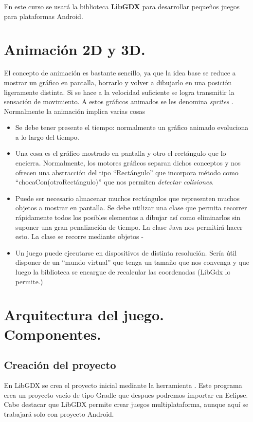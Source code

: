 \documentclass[a4paper,12pt,spanish]{sphinxmanual}
\begin{document}
En este curso se usará la biblioteca \textbf{LibGDX} para desarrollar pequeños juegos para plataformas Android.


\section{Animación 2D y 3D.}
\label{tema4:animacion-2d-y-3d}
El concepto de animación es bastante sencillo, ya que la idea base se reduce a mostrar un gráfico en pantalla, borrarlo y volver a dibujarlo en una posición ligeramente distinta. Si se hace a la velocidad suficiente se logra transmitir la sensación de movimiento. A estos gráficos animados se les denomina \emph{sprites} . Normalmente la animación implica varias cosas
\begin{itemize}
\item {} 
Se debe tener presente el tiempo: normalmente un gráfico animado evoluciona a lo largo del tiempo.

\item {} 
Una cosa es el gráfico mostrado en pantalla y otro el rectángulo que lo encierra. Normalmente, los motores gráficos separan dichos conceptos y nos ofrecen una abstracción del tipo ``Rectángulo'' que incorpora método como ``chocaCon(otroRectángulo)'' que nos permiten \emph{detectar colisiones}.

\item {} 
Puede ser necesario almacenar muchos rectángulos que representen muchos objetos a mostrar en pantalla. Se debe utilizar una clase que permita recorrer rápidamente todos los posibles elementos a dibujar así como eliminarlos sin suponer una gran penalización de tiempo. La clase Java  nos permitirá hacer esto. La clase  se recorre mediante objetos -

\item {} 
Un juego puede ejecutarse en dispositivos de distinta resolución. Sería útil disponer de un ``mundo virtual'' que tenga un tamaño que nos convenga y que luego la biblioteca se encargue de recalcular las coordenadas (LibGdx lo permite.)

\end{itemize}


\section{Arquitectura del juego. Componentes.}
\label{tema4:arquitectura-del-juego-componentes}

\subsection{Creación del proyecto}
\label{tema4:creacion-del-proyecto}
En LibGDX se crea el proyecto inicial mediante la herramienta . Este programa crea un proyecto vacío de tipo Gradle que despues podremos importar en Eclipse. Cabe destacar que LibGDX permite crear juegos multiplataforma, aunque aquí se trabajará solo con proyecto Android.
\end{document}
